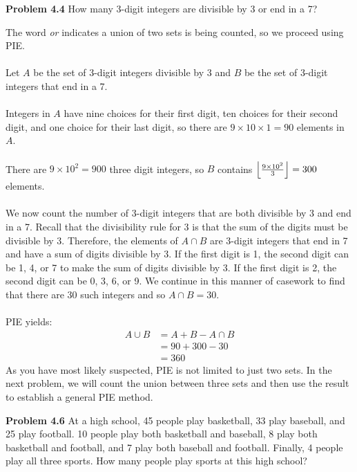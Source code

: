 \documentclass[11pt]{scrartcl}
\DeclarePairedDelimiter\floor{\lfloor}{\rfloor}
\begin{document}
\begin{tcolorbox}
\textbf{Problem 4.4} How many 3-digit integers are divisible by 3 or end in a 7? 
\end{tcolorbox}
\noindent 
The word \textit{or} indicates a union of two sets is being counted, so we proceed using PIE. \\
\\
\noindent
Let $A$ be the set of 3-digit integers divisible by 3 and $B$ be the set of 3-digit integers that end in a 7. \\
\\
\noindent
Integers in $A$ have nine choices for their first digit, ten choices for their second digit, and one choice for their last digit, so there are $9 \times 10 \times 1=90$ elements in $A$. \\
\\
\noindent 
There are $9 \times 10^2=900$ three digit integers, so $B$ contains $\floor*{\frac{9 \times 10^2}{3}}=300$ elements. \\
\\
\noindent 
We now count the number of 3-digit integers that are both divisible by 3 and end in a 7. Recall that the divisibility rule for 3 is that the sum of the digits must be divisible by 3. Therefore, the elements of $A \cap B$ are 3-digit integers that end in 7 and have a sum of digits divisible by 3. If the first digit is 1, the second digit can be 1, 4, or 7 to make the sum of digits divisible by 3. If the first digit is 2, the second digit can be 0, 3, 6, or 9. We continue in this manner of casework to find that there are 30 such integers and so $A \cap B=30$. \\
\\
\noindent 
PIE yields:
\begin{align*}
{A \cup B} &={A} + {B} -{A \cap B} \\
           &=90+300-30 \\
           &=360
\end{align*}
\noindent 
As you have most likely suspected, PIE is not limited to just two sets. In the next problem, we will count the union between three sets and then use the result to establish a general PIE method. 
\\
\begin{tcolorbox}
\textbf{Problem 4.6} At a high school, 45 people play basketball, 33 play baseball, and 25 play football. 10 people play both basketball and baseball, 8 play both basketball and football, and 7 play both baseball and football. Finally, 4 people play all three sports. How many people play sports at this high school?
\end{tcolorbox}
\end{document}

